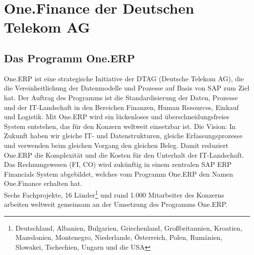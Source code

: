 \section{One.Finance der Deutschen Telekom AG}
\subsection{Das Programm One.ERP}
One.ERP ist eine strategische Initiative der DTAG (Deutsche Telekom AG), die die Vereinheitlichung der Datenmodelle und Prozesse auf Basis von SAP zum Ziel hat. Der Auftrag des Programms ist die Standardisierung der Daten, Prozesse und der IT-Landschaft in den Bereichen Finanzen, Human Resources, Einkauf und Logistik. Mit One.ERP wird ein lückenloses und überschneidungsfreies System entstehen, das für den Konzern weltweit einsetzbar ist. Die Vision: In Zukunft haben wir gleiche IT- und Datenstrukturen, gleiche Erfassungsprozesse und verwenden beim gleichen Vorgang den gleichen Beleg. Damit reduziert One.ERP die Komplexität und die Kosten für den Unterhalt der IT-Landschaft. Das Rechnungswesen (FI, CO) wird zukünftig in einem zentralen SAP ERP Financials System abgebildet, welches vom Programm One.ERP den Namen One.Finance erhalten hat. \\
Sechs Fachprojekte, 16 Länder\footnote{Deutschland, Albanien, Bulgarien, Griechenland, Großbritannien, Kroatien, Mazedonien, Montenegro, Niederlande, Österreich, Polen, Rumänien, Slowakei, Tschechien, Ungarn und die USA} und rund 1.000 Mitarbeiter des Konzerns arbeiten weltweit gemeinsam an der Umsetzung des Programms One.ERP.

